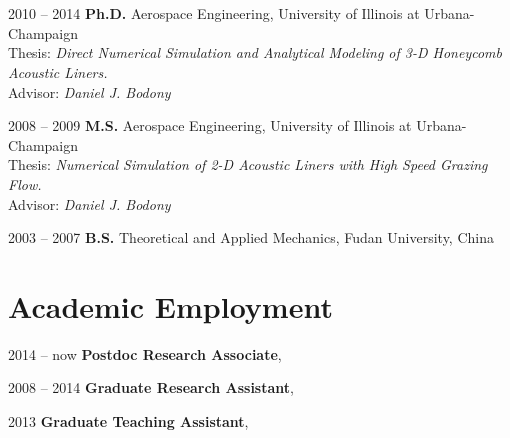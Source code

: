 \documentclass[11pt,letter]{article}
\begin{document}



\section*{}
\begin{CV}
\item[2010 -- 2014]\textbf{Ph.D.} {Aerospace Engineering, University of Illinois at Urbana-Champaign}  \\%
Thesis: \emph{Direct Numerical Simulation and Analytical Modeling of 3-D Honeycomb Acoustic Liners. } \\
Advisor: \emph{Daniel J. Bodony}
\item[2008 -- 2009]\textbf{M.S.} {Aerospace Engineering, University of Illinois at Urbana-Champaign}\\%
Thesis: \emph{Numerical Simulation of 2-D Acoustic Liners with High Speed Grazing Flow.}  \\
Advisor: \emph{Daniel J. Bodony}
\item[2003 -- 2007]\textbf{B.S.}  {Theoretical and Applied Mechanics,   Fudan University, China}\\%
\end{CV} 


\section*{Academic Employment}
\begin{CV}
\item[2014 -- now] \textbf{Postdoc Research Associate}, \UIUC 
\item[2008 -- 2014] \textbf{Graduate Research Assistant}, \UIUC 
\item[2013] \textbf{Graduate Teaching Assistant}, \UIUC
\end{CV} 
\section*{}
\end{document}
